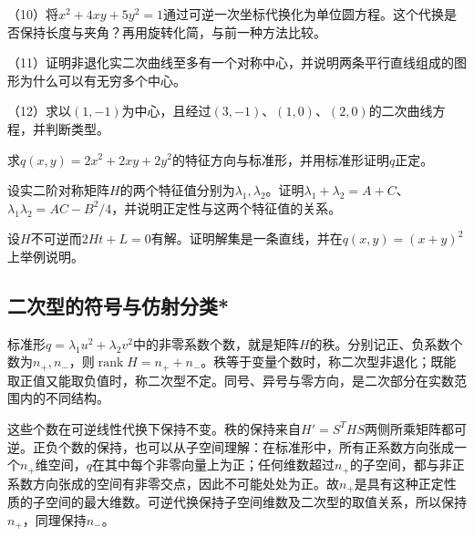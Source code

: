 \begin{exercise}
\begin{samepage}
（10）将\(x^2+4xy+5y^2=1\)通过可逆一次坐标代换化为单位圆方程。这个代换是否保持长度与夹角？再用旋转化简，与前一种方法比较。
\par
\end{samepage}

\begin{samepage}
（11）证明非退化实二次曲线至多有一个对称中心，并说明两条平行直线组成的图形为什么可以有无穷多个中心。
\par
\end{samepage}

\begin{samepage}
（12）求以\((1,-1)\)为中心，且经过\((3,-1)\)、\((1,0)\)、\((2,0)\)的二次曲线方程，并判断类型。
\par
\end{samepage}

\begin{samepage}
求\(q(x,y)=2x^2+2xy+2y^2\)的特征方向与标准形，并用标准形证明\(q\)正定。
\par
\end{samepage}

\begin{samepage}
设实二阶对称矩阵\(H\)的两个特征值分别为\(\lambda_1,\lambda_2\)。证明\(\lambda_1+\lambda_2=A+C\)、\(\lambda_1\lambda_2=AC-B^2/4\)，并说明正定性与这两个特征值的关系。
\par
\end{samepage}

\begin{samepage}
设\(H\)不可逆而\(2Ht+L=0\)有解。证明解集是一条直线，并在\(q(x,y)=(x+y)^2\)上举例说明。
\par
\end{samepage}

\end{exercise}
\newpage
\subsection{二次型的符号与仿射分类*}
\label{subsec:quadratic-affine-classification}

标准形\(q=\lambda_1u^2+\lambda_2v^2\)中的非零系数个数，就是矩阵\(H\)的秩。分别记正、负系数个数为\(n_+,n_-\)，则\(\operatorname{rank}H=n_++n_-\)。秩等于变量个数时，称二次型非退化；既能取正值又能取负值时，称二次型不定。同号、异号与零方向，是二次部分在实数范围内的不同结构。

这些个数在可逆线性代换下保持不变。秩的保持来自\(H'=S^THS\)两侧所乘矩阵都可逆。正负个数的保持，也可以从子空间理解：在标准形中，所有正系数方向张成一个\(n_+\)维空间，\(q\)在其中每个非零向量上为正；任何维数超过\(n_+\)的子空间，都与非正系数方向张成的空间有非零交点，因此不可能处处为正。故\(n_+\)是具有这种正定性质的子空间的最大维数。可逆代换保持子空间维数及二次型的取值关系，所以保持\(n_+\)，同理保持\(n_-\)。


